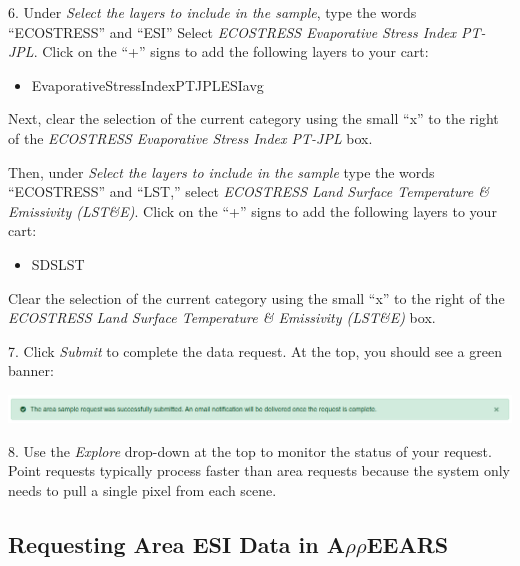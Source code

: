 \documentclass[oneside,a4paper,11pt,explicit]{book}
\begin{document}
\vspace{.5em}

6. Under \textit{Select the layers to include in the sample}, type the words ``ECOSTRESS'' and ``ESI'' Select \textit{ECOSTRESS Evaporative Stress Index PT-JPL}. Click on the ``+'' signs to add the following layers to your cart: 

\begin{itemize}
	\item Evaporative\textunderscore Stress\textunderscore Index\textunderscore PT\textunderscore JPL\textunderscore ESIavg
\end{itemize}

Next, clear the selection of the current category using the small ``x'' to the right of the \textit{ECOSTRESS Evaporative Stress Index PT-JPL} box.

\vspace{.5em}

Then, under \textit{Select the layers to include in the sample} type the words ``ECOSTRESS'' and ``LST,'' select \textit{ECOSTRESS Land Surface Temperature \& Emissivity (LST\&E)}. Click on the ``+'' signs to add the following layers to your cart: 

\begin{itemize}
	\item SDS\textunderscore LST
\end{itemize}

Clear the selection of the current category using the small ``x'' to the right of the \textit{ECOSTRESS Land Surface Temperature \& Emissivity (LST\&E)} box.

7. Click \textit{Submit} to complete the data request. At the top, you should see a green banner:

\vspace{.5em}

\centerline{\includegraphics[width=\textwidth]{RequestSuccess.png}}

8. Use the \textit{Explore} drop-down at the top to monitor the status of your request. Point requests typically process faster than area requests because the system only needs to pull a single pixel from each scene.

\subsection{Requesting Area ESI Data in A$\rho\rho$EEARS}
\end{document}
